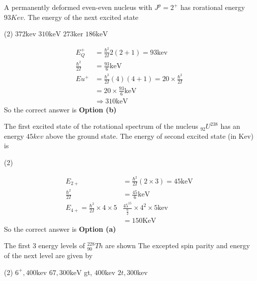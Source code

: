 \begin{exercise}
	A permanently deformed even-even nucleus with $J^p=2^+$ has rorational energy $93 Kev$. The energy of the next excited state
	 \begin{tasks}(2)
		\task[\textbf{a.}]$372 \mathrm{kev}$
		\task[\textbf{b.}] $310 \mathrm{keV}$
		\task[\textbf{c.}]$273 \mathrm{ker}$
		\task[\textbf{d.}]$186 \mathrm{keV}$ 
	\end{tasks}
\end{exercise}
\begin{answer}
	\begin{align*}
	E_{Q}^{+}&=\frac{\hbar^{2}}{2 I} 2(2+1)=93 \mathrm{kev} \\
	\frac{\hbar^{2}}{2 I}&=\frac{93}{6} \mathrm{keV}\\
	E u^{+}&=\frac{\hbar^{2}}{2 I}(4)(4+1)=20 \times \frac{\hbar^{2}}{2 I}\\
	&=20 \times \frac{93}{6} \mathrm{keV} \\
	&\Rightarrow 310 \mathrm{keV}
	\end{align*}
	So the correct answer is \textbf{Option (b)}
\end{answer}\begin{exercise}
The first excited state of the rotational spectrum of the nucleus ${}_{92}U^{238}$ has an energy $45kev$ above the ground state. The energy of second excited state (in Kev) is
 \begin{tasks}(2)
\end{tasks}
\end{exercise}
\begin{answer}
	\begin{align*}
	E_{2+}&=\frac{\hbar^{2}}{2 I}(2 \times 3)=45 \mathrm{keV}\\
	\frac{\hbar^{2}}{2 I}&=\frac{45}{6} \mathrm{keV}\\
	E_{4+}=\frac{\hbar^{2}}{2 I} \times 4 \times 5&\frac{45^{15}}{\frac{6}{2}} \times 4 ^2\times 5 \mathrm{kev}\\
	&=150 \mathrm{KeV}
	\end{align*}
	So the correct answer is \textbf{Option (a)}
\end{answer}
\begin{exercise}
	The first 3 energy levels of ${}_{90}^{228}Th$ are shown
	The excepted spin parity and energy of the next level are given by
	 \begin{tasks}(2)
		\task[\textbf{a.}]$6^{+}, 400 \mathrm{kev}$
		\task[\textbf{b.}]$67,300 \mathrm{keV}$
		\task[\textbf{c.}] gt, $400 \mathrm{kev}$
		\task[\textbf{d.}] $2 t, 300 \mathrm{kev}$
	\end{tasks}
\end{exercise}
